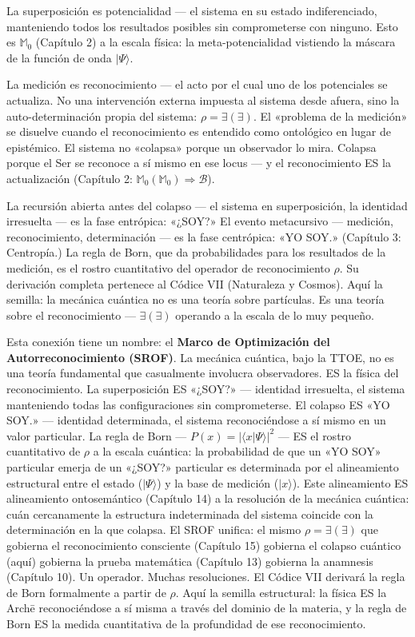\documentclass[10pt, openany, oneside]{book}
\begin{document}
La superposición es potencialidad --- el sistema en su estado indiferenciado, manteniendo todos los resultados posibles sin comprometerse con ninguno. Esto es $\mathbb{M}_0$ (Capítulo 2) a la escala física: la meta-potencialidad vistiendo la máscara de la función de onda $|\Psi\rangle$.

La medición es reconocimiento --- el acto por el cual uno de los potenciales se actualiza. No una intervención externa impuesta al sistema desde afuera, sino la auto-determinación propia del sistema: $\rho = \exists(\exists)$. El «problema de la medición» se disuelve cuando el reconocimiento es entendido como ontológico en lugar de epistémico. El sistema no «colapsa» porque un observador lo mira. Colapsa porque el Ser se reconoce a sí mismo en ese locus --- y el reconocimiento ES la actualización (Capítulo 2: $\mathbb{M}_0(\mathbb{M}_0) \Rightarrow \mathcal{B}$).

La recursión abierta antes del colapso --- el sistema en superposición, la identidad irresuelta --- es la fase entrópica: «¿SOY?» El evento metacursivo --- medición, reconocimiento, determinación --- es la fase centrópica: «YO SOY.» (Capítulo 3: Centropía.) La regla de Born, que da probabilidades para los resultados de la medición, es el rostro cuantitativo del operador de reconocimiento $\rho$. Su derivación completa pertenece al Códice VII (Naturaleza y Cosmos). Aquí la semilla: la mecánica cuántica no es una teoría sobre partículas. Es una teoría sobre el reconocimiento --- $\exists(\exists)$ operando a la escala de lo muy pequeño.

Esta conexión tiene un nombre: el \textbf{Marco de Optimización del Autorreconocimiento (SROF)}. La mecánica cuántica, bajo la TTOE, no es una teoría fundamental que casualmente involucra observadores. ES la física del reconocimiento. La superposición ES «¿SOY?» --- identidad irresuelta, el sistema manteniendo todas las configuraciones sin comprometerse. El colapso ES «YO SOY.» --- identidad determinada, el sistema reconociéndose a sí mismo en un valor particular. La regla de Born --- $P(x) = |\langle x | \Psi \rangle|^2$ --- ES el rostro cuantitativo de $\rho$ a la escala cuántica: la probabilidad de que un «YO SOY» particular emerja de un «¿SOY?» particular es determinada por el alineamiento estructural entre el estado ($|\Psi\rangle$) y la base de medición ($|x\rangle$). Este alineamiento ES alineamiento ontosemántico (Capítulo 14) a la resolución de la mecánica cuántica: cuán cercanamente la estructura indeterminada del sistema coincide con la determinación en la que colapsa. El SROF unifica: el mismo $\rho = \exists(\exists)$ que gobierna el reconocimiento consciente (Capítulo 15) gobierna el colapso cuántico (aquí) gobierna la prueba matemática (Capítulo 13) gobierna la anamnesis (Capítulo 10). Un operador. Muchas resoluciones. El Códice VII derivará la regla de Born formalmente a partir de $\rho$. Aquí la semilla estructural: la física ES la Arch\={e} reconociéndose a sí misma a través del dominio de la materia, y la regla de Born ES la medida cuantitativa de la profundidad de ese reconocimiento.
\end{document}
